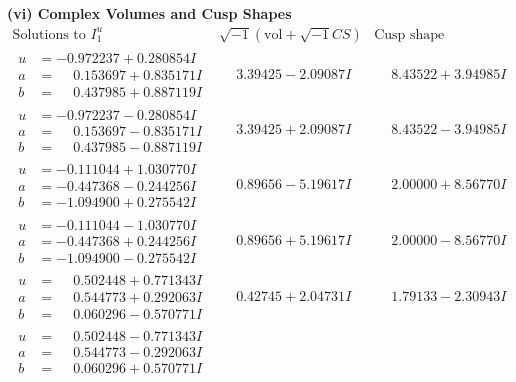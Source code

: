 \documentclass[1p]{elsarticle_modified}
\theoremstyle{definition}
\newcommand{\I}{\sqrt{-1}}
\begin{document}
\newpage\flushleft \textbf{(vi) Complex Volumes and Cusp Shapes}
$$\begin{array}{c|c|c}  
\text{Solutions to }I^u_{1}& \I (\text{vol} + \sqrt{-1}CS) & \text{Cusp shape}\\
 \hline 
\begin{aligned}
u &= -0.972237 + 0.280854 I \\
a &= \phantom{-}0.153697 + 0.835171 I \\
b &= \phantom{-}0.437985 + 0.887119 I\end{aligned}
 & \phantom{-}3.39425 - 2.09087 I & \phantom{-}8.43522 + 3.94985 I \\ \hline\begin{aligned}
u &= -0.972237 - 0.280854 I \\
a &= \phantom{-}0.153697 - 0.835171 I \\
b &= \phantom{-}0.437985 - 0.887119 I\end{aligned}
 & \phantom{-}3.39425 + 2.09087 I & \phantom{-}8.43522 - 3.94985 I \\ \hline\begin{aligned}
u &= -0.111044 + 1.030770 I \\
a &= -0.447368 - 0.244256 I \\
b &= -1.094900 + 0.275542 I\end{aligned}
 & \phantom{-}0.89656 - 5.19617 I & \phantom{-}2.00000 + 8.56770 I \\ \hline\begin{aligned}
u &= -0.111044 - 1.030770 I \\
a &= -0.447368 + 0.244256 I \\
b &= -1.094900 - 0.275542 I\end{aligned}
 & \phantom{-}0.89656 + 5.19617 I & \phantom{-}2.00000 - 8.56770 I \\ \hline\begin{aligned}
u &= \phantom{-}0.502448 + 0.771343 I \\
a &= \phantom{-}0.544773 + 0.292063 I \\
b &= \phantom{-}0.060296 - 0.570771 I\end{aligned}
 & \phantom{-}0.42745 + 2.04731 I & \phantom{-}1.79133 - 2.30943 I \\ \hline\begin{aligned}
u &= \phantom{-}0.502448 - 0.771343 I \\
a &= \phantom{-}0.544773 - 0.292063 I \\
b &= \phantom{-}0.060296 + 0.570771 I\end{aligned}

\end{array}$$
\end{document}
